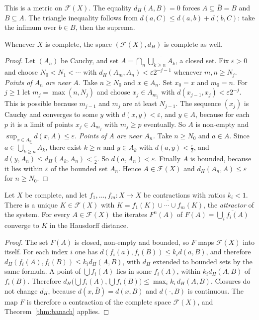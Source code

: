 This is a metric on $\mathcal F(X)$. The equality $d_H(A,B)=0$ forces $A\subseteq\bar B=B$ and $B\subseteq A$. The triangle inequality follows from $d(a,C)\le d(a,b)+d(b,C)$: take the infimum over $b\in B$, then the suprema.

\begin{theorem}\label{thm:hausdorffcomplete}
Whenever $X$ is complete, the space $(\mathcal F(X),d_H)$ is complete as well.
\end{theorem}
\begin{proof}
Let $(A_n)$ be Cauchy, and set $A=\bigcap_n\overline{\bigcup_{k\ge n}A_k}$, a closed set. Fix $\varepsilon>0$ and choose $N_0<N_1<\cdots$ with $d_H(A_m,A_n)<\varepsilon2^{-j-1}$ whenever $m,n\ge N_j$. \emph{Points of $A_n$ are near $A$.} Take $n\ge N_0$ and $x\in A_n$. Set $x_0=x$ and $m_0=n$. For $j\ge1$ let $m_j=\max(n,N_j)$ and choose $x_j\in A_{m_j}$ with $d(x_{j-1},x_j)<\varepsilon2^{-j}$. This is possible because $m_{j-1}$ and $m_j$ are at least $N_{j-1}$. The sequence $(x_j)$ is Cauchy and converges to some $y$ with $d(x,y)<\varepsilon$, and $y\in A$, because for each $p$ it is a limit of points $x_j\in A_{m_j}$ with $m_j\ge p$ eventually. So $A$ is non-empty and $\sup_{x\in A_n}d(x,A)\le\varepsilon$. \emph{Points of $A$ are near $A_n$.} Take $n\ge N_0$ and $a\in A$. Since $a\in\overline{\bigcup_{k\ge n}A_k}$, there exist $k\ge n$ and $y\in A_k$ with $d(a,y)<\frac\varepsilon2$, and $d(y,A_n)\le d_H(A_k,A_n)<\frac\varepsilon2$. So $d(a,A_n)<\varepsilon$. Finally $A$ is bounded, because it lies within $\varepsilon$ of the bounded set $A_n$. Hence $A\in\mathcal F(X)$ and $d_H(A_n,A)\le\varepsilon$ for $n\ge N_0$.
\end{proof}

\begin{theorem}[Hutchinson, 1981]\label{thm:hutchinson}
Let $X$ be complete, and let $f_1,\dots,f_m:X\to X$ be contractions with ratios $k_i<1$. There is a unique $K\in\mathcal F(X)$ with $K=\overline{f_1(K)\cup\cdots\cup f_m(K)}$, the \emph{attractor} of the system. For every $A\in\mathcal F(X)$ the iterates $F^n(A)$ of $F(A)=\overline{\bigcup_if_i(A)}$ converge to $K$ in the Hausdorff distance.
\end{theorem}
\begin{proof}
The set $F(A)$ is closed, non-empty and bounded, so $F$ maps $\mathcal F(X)$ into itself. For each index $i$ one has $d(f_i(a),f_i(B))\le k_id(a,B)$, and therefore $d_H(f_i(A),f_i(B))\le k_id_H(A,B)$, with $d_H$ extended to bounded sets by the same formula. A point of $\bigcup f_i(A)$ lies in some $f_i(A)$, within $k_id_H(A,B)$ of $f_i(B)$. Therefore $d_H\bigl(\bigcup f_i(A),\bigcup f_i(B)\bigr)\le\max_ik_i\,d_H(A,B)$. Closures do not change $d_H$, because $d(x,\bar B)=d(x,B)$ and $d(\cdot,B)$ is continuous. The map $F$ is therefore a contraction of the complete space $\mathcal F(X)$, and Theorem~\ref{thm:banach} applies.
\end{proof}

